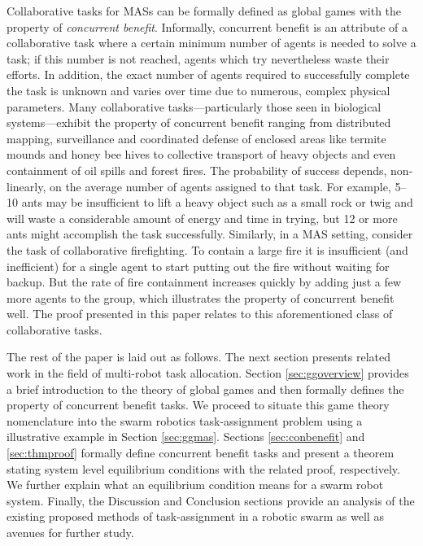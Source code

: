 \documentclass[conference]{ieeeconf}
\begin{document}
Collaborative tasks for MASs can be formally defined as global games with the property of \emph{concurrent benefit}. Informally, concurrent benefit is an attribute of a collaborative task where a certain minimum number of agents is needed to solve a task; if this number is not reached, agents which try nevertheless waste their efforts. In addition, the exact number of agents required to successfully complete the task is unknown and varies over time due to numerous, complex physical parameters. Many collaborative tasks---particularly those seen in biological systems---exhibit the property of concurrent benefit ranging from distributed mapping, surveillance and coordinated defense of enclosed areas like termite mounds and honey bee hives \cite{Breed1990} to collective transport of heavy objects and even containment of oil spills and forest fires. The probability of success depends, non-linearly, on the average number of agents assigned to that task. For example, 5--10 ants may be insufficient to lift a heavy object such as a small rock or twig and will waste a considerable amount of energy and time in trying, but 12 or more ants might accomplish the task successfully. Similarly, in a MAS setting, consider the task of collaborative firefighting. To contain a large fire it is insufficient (and inefficient) for a single agent to start putting out the fire without waiting for backup. But the rate of fire containment increases quickly by adding just a few more agents to the group, which illustrates the property of concurrent benefit well. The proof presented in this paper relates to this aforementioned class of collaborative tasks.

The rest of the paper is laid out as follows. The next section presents related work in the field of multi-robot task allocation. Section \ref{sec:ggoverview} provides a brief introduction to the theory of global games and then formally defines the property of concurrent benefit tasks. We proceed to situate this game theory nomenclature into the swarm robotics task-assignment problem using a illustrative example in Section \ref{sec:ggmas}. Sections \ref{sec:conbenefit} and \ref{sec:thmproof} formally define concurrent benefit tasks and present a theorem stating system level equilibrium conditions with the related proof, respectively. We further explain what an equilibrium condition means for a swarm robot system. Finally, the Discussion and Conclusion sections provide an analysis of the existing proposed methods of task-assignment in a robotic swarm as well as avenues for further study.
\end{document}

